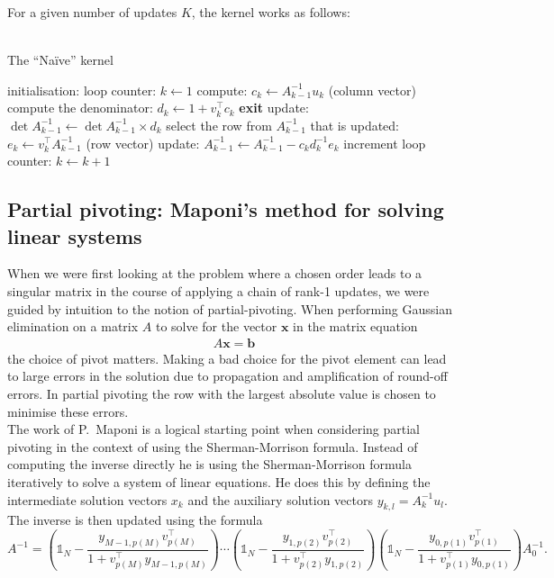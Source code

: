 \documentclass[11pt]{article}
\numberwithin{figure}{section}
\numberwithin{table}{section}
\begin{document}
				For a given number of updates $K$, the kernel works as follows:\\
				\\
				\begin{algorithm}[H]
				\caption{The ``Na\"{i}ve'' kernel}\label{algo:naive}
				initialisation: loop counter: $k \gets 1$\;
				{
					compute: $c_k \gets A^{-1}_{k-1}u_k$ (column vector)\;
					compute the denominator: $d_k \gets 1 + v_k^\top c_k$\;
					{
						\textbf{exit}\;
					}
					update: $\det A^{-1}_{k-1} \gets \det A^{-1}_{k-1}\times d_k$\;
					select the row from $A^{-1}_{k-1}$ that is updated: $e_k \gets v_k^\top A^{-1}_{k-1}$ (row vector)\;
					update: $A^{-1}_{k-1} \gets A^{-1}_{k-1} - c_kd_k^{-1}e_k$\;
					increment loop counter: $k \gets k + 1$\;
				}

				\end{algorithm}
		
			\subsection{Partial pivoting: Maponi's method for solving linear systems}
				When we were first looking at the problem where a chosen order leads to a singular matrix in the course of applying a chain of rank-1 updates, we were guided by intuition to the notion of partial-pivoting. When performing Gaussian elimination on a matrix $A$ to solve for the vector $\mathbf{x}$ in the matrix equation
				\begin{align}
					A\mathbf{x}=\mathbf{b}
				\end{align}
				the choice of pivot matters. Making a bad choice for the pivot element can lead to large errors in the solution due to propagation and amplification of round-off errors. In partial pivoting the row with the largest absolute value is chosen to minimise these errors.\\
				
				The work of P.~Maponi\cite{MAPONI2007276} is a logical starting point when considering partial pivoting in the context of using the Sherman-Morrison formula. Instead of computing the inverse directly he is using the Sherman-Morrison formula iteratively to solve a system of linear equations. He does this by defining the intermediate solution vectors $x_k$ and the auxiliary solution vectors $y_{k,l} = A^{-1}_{k}u_l$. The inverse is then updated using the formula
				\begin{equation}\label{eq:Ainv}
	A^{-1} =
		\left(\mathbb{1}_N-\frac{y_{M-1,p(M)}v_{p(M)}^\top }{1+v_{p(M)}^\top y_{M-1,p(M)}}\right)
		\cdots
		\left(\mathbb{1}_N-\frac{y_{1,p(2)}v_{p(2)}^\top }{1+v_{p(2)}^\top y_{1,p(2)}}\right)
		\left(\mathbb{1}_N-\frac{y_{0,p(1)}v_{p(1)}^\top }{1+v_{p(1)}^\top y_{0,p(1)}}\right)
		A_0^{-1}.
\end{equation}
				
\end{document}
